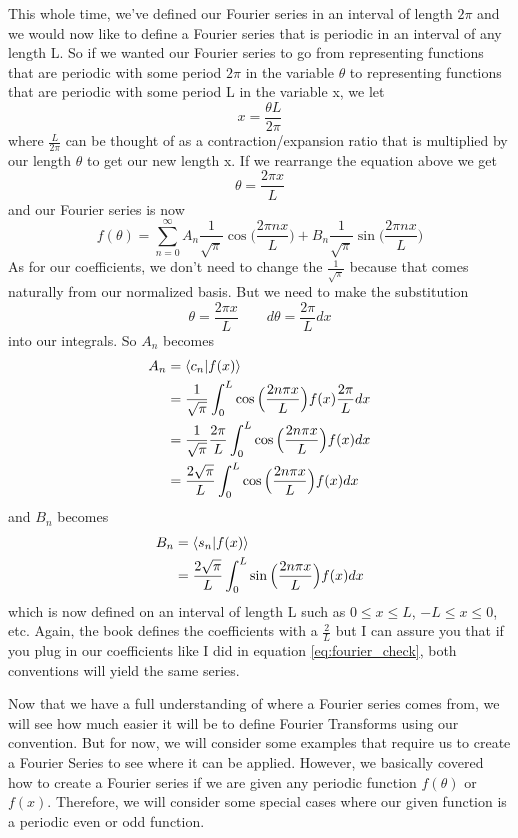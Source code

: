 \documentclass{article}
\newcommand{\be}{\begin{equation}}
\newcommand{\ee}{\end{equation}}
\begin{document}
This whole time, we've defined our Fourier series in an interval of length $2 \pi$ and we would now like to define a Fourier series that is periodic in an interval of any length L.
So if we wanted our Fourier series to go from representing functions that are periodic with some period $2\pi$ in the variable $\theta$ to representing functions that are periodic with some period L in the variable x, we let
\be
  x = \frac{\theta L}{2 \pi}
\ee
where $\frac{L}{2 \pi}$ can be thought of as a contraction/expansion ratio that is multiplied by our length $\theta$ to get our new length x.
If we rearrange the equation above we get
\be
 \theta = \frac{2 \pi x}{L}
\ee
and our Fourier series is now
\be
 f(\theta) = \sum_{n = 0}^{\infty} A_n \frac{1}{\sqrt{\pi}} \cos \Big( \frac{2 \pi n x}{L} \Big) + B_n \frac{1}{\sqrt{\pi}} \sin \Big( \frac{2 \pi n x}{L} \Big)
\ee
As for our coefficients, we don't need to change the $\frac{1}{\sqrt{\pi}}$ because that comes naturally from our normalized basis.
But we need to make the substitution
\be
  \theta = \frac{2 \pi x}{L} \qquad d\theta = \frac{2 \pi}{L} dx
\ee
into our integrals.
So $A_n$ becomes
\be
  \begin{split}
    A_n &= \braket{c_n|f(x)} \\
    &= \frac{1}{\sqrt{\pi}} \int_0^{L} \cos \Big( \frac{2 n \pi x}{L} \Big) f(x) \frac{2 \pi}{L} dx \\
    &= \frac{1}{\sqrt{\pi}} \frac{2 \pi}{L} \int_0^{L} \cos \Big( \frac{2 n \pi x}{L} \Big) f(x) dx \\
    &= \frac{2 \sqrt{\pi}}{L} \int_0^{L} \cos \Big( \frac{2 n \pi x}{L} \Big) f(x) dx \\
  \end{split}
\ee
and $B_n$ becomes
\be
  \begin{split}
    B_n &= \braket{s_n|f(x)} \\
    &= \frac{2 \sqrt{\pi}}{L} \int_0^{L} \sin \Big( \frac{2 n \pi x}{L} \Big) f(x) dx \\
  \end{split}
\ee
which is now defined on an interval of length L such as $0 \leq x \leq L$, $-L \leq x \leq 0$, etc.
Again, the book defines the coefficients with a $\frac{2}{L}$ but I can assure you that if you plug in our coefficients like I did in equation \ref{eq:fourier_check}, both conventions will yield the same series.

Now that we have a full understanding of where a Fourier series comes from, we will see how much easier it will be to define Fourier Transforms using our convention.
But for now, we will consider some examples that require us to create a Fourier Series to see where it can be applied.
However, we basically covered how to create a Fourier series if we are given any periodic function $f(\theta)$ or $f(x)$.
Therefore, we will consider some special cases where our given function is a periodic even or odd function.
\end{document}
